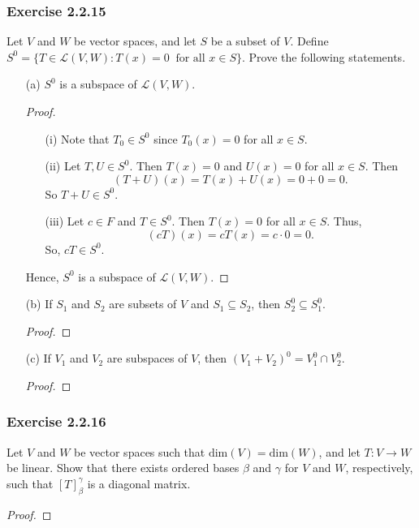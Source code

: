 \subsubsection{Exercise 2.2.15} Let \( V  \) and \( W  \) be vector spaces, and let \( S  \) be a subset of \( V  \). Define \( S^{0} = \{ T \in \mathcal{L}(V,W) : T(x) = 0 \ \text{ for all } x \in S  \}  \). Prove the following statements.
\begin{enumerate}
    \item[(a)] \( S^{0}  \) is a subspace of \( \mathcal{L}(V,W) \).
        \begin{proof}
        \begin{enumerate}
            \item[(i)] Note that \( {T}_{0} \in S^{0} \) since \( {T}_{0}(x) = 0  \) for all \( x \in S  \).
            \item[(ii)] Let \( T, U \in S^{0} \). Then \( T(x) = 0  \) and \( U(x) = 0  \) for all \( x \in S  \). Then 
                \[ (T+U)(x) = T(x) + U(x) = 0 + 0 = 0. \]
                So \( T + U \in S^{0} \).
            \item[(iii)] Let \( c \in F  \) and \( T \in S^{0} \). Then \( T(x) = 0  \) for all \( x \in S  \). Thus, 
                \[  (cT)(x) = c T(x) = c \cdot 0 = 0. \]
                So, \( cT \in S^{0} \).
        \end{enumerate} 
        Hence, \( S^{0} \) is a subspace of \( \mathcal{L}(V,W) \).
        \end{proof}
    \item[(b)] If \( {S}_{1} \) and \( {S}_{2} \) are subsets of \( V  \) and \( {S}_{1} \subseteq {S}_{2} \), then \( {S}_{2}^{0} \subseteq {S}_{1}^{0} \).
        \begin{proof}
        
        \end{proof}
    \item[(c)] If \( {V}_{1} \) and \( {V}_{2} \) are subspaces of \( V  \), then \( ({V}_{1} + {V}_{2})^{0} = {V}_{1}^{0} \cap V_{2}^{0} \).
        \begin{proof}
        
        \end{proof}
\end{enumerate}

\subsubsection{Exercise 2.2.16} Let \( V  \) and \( W  \) be vector spaces such that \( \text{dim}(V) = \text{dim}(W) \), and let \( T: V \to W  \) be linear. Show that there exists ordered bases \( \beta  \) and \( \gamma \) for \( V  \) and \( W  \), respectively, such that \( [T]_{\beta}^{\gamma}  \) is a diagonal matrix.
\begin{proof}

\end{proof}

